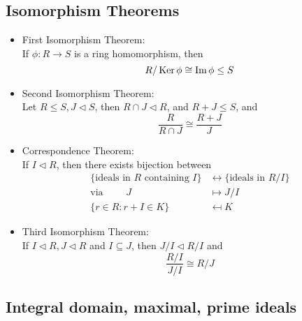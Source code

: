 \subsection*{Isomorphism Theorems}

\begin{itemize}
      \item First Isomorphism Theorem: \\
            If $\phi: R \to S$ is a ring homomorphism, then \[R/ \operatorname{Ker} \phi \cong \operatorname{Im} \phi \leq S\]

      \item Second Isomorphism Theorem: \\
            Let $R \leq S, J \triangleleft S$, then $ R\cap J \triangleleft R$, and $R+J \leq S$, and  \[ \frac{R}{R \cap J} \cong \frac{R+J}{J}\]

      \item Correspondence Theorem: \\
            If $I \triangleleft R$, then there exists bijection between
            \begin{align*}
                  \{\text{ideals in } R \text{ containing } I \} & \leftrightarrow \{\text{ideals in } R/I \} \\
                  \text{via } \qquad  J                          & \mapsto J/I                                \\
                  \{r \in R : r+I \in K\}                        & \mapsfrom K
            \end{align*}

      \item Third Isomorphism Theorem: \\
            If $I \triangleleft R, J \triangleleft R$ and $I \subseteq J$, then $J/I \triangleleft R/I$ and \[\frac{R/I}{J/I} \cong R/J \]
\end{itemize}

\subsection*{Integral domain, maximal, prime ideals}

